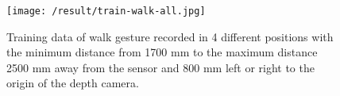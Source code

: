 \begin{figure}
	[h] \centering 
	\texttt{[image: /result/train-walk-all.jpg]} \caption{Training data of walk gesture recorded in 4 different positions with the minimum distance from 1700 mm to the maximum distance 2500 mm away from the sensor and 800 mm left or right to the origin of the depth camera.} 
	\label{fg:ges:pos} 
\end{figure}
